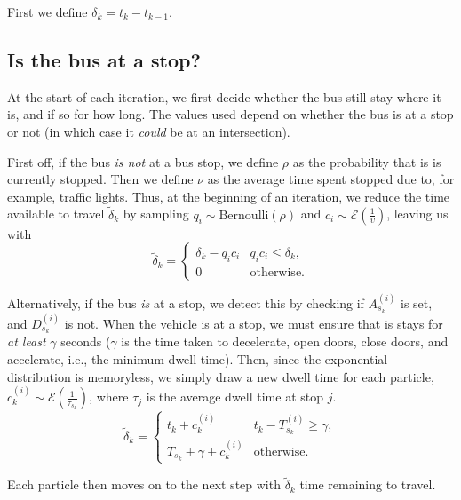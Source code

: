 \documentclass[14paper,twoside]{article}
\begin{document}
First we define $\delta_k = t_k - t_{k-1}$.

\subsection{Is the bus at a stop?}

At the start of each iteration, we first decide whether the bus still stay where it is,
and if so for how long.
The values used depend on whether the bus is at a stop or not (in which case it \emph{could} be 
at an intersection).

First off, if the bus \emph{is not} at a bus stop, we define $\rho$ as the probability that is
is currently stopped.
Then we define $\nu$ as the average time spent stopped due to, for example, traffic lights.
Thus, at the beginning of an iteration, we reduce the time available to travel $\tilde \delta_k$ 
by sampling $q_i \sim \mathrm{Bernoulli}(\rho)$ and $c_i \sim \mathcal{E}\left(\frac{1}{\upsilon}\right)$,
leaving us with
\begin{equation}
  \label{eq:start_intersection}
  \tilde\delta_k = 
  \begin{cases}
    \delta_k - q_i c_i & q_i c_i \leq \delta_k, \\
    0 & \text{otherwise}.
  \end{cases}
\end{equation}

Alternatively, if the bus \emph{is} at a stop, we detect this by checking if $A_{s_k}^{(i)}$ is set, 
and $D_{s_k}^{(i)}$ is not.
When the vehicle is at a stop, we must ensure that is stays for \emph{at least} $\gamma$ seconds
($\gamma$ is the time taken to decelerate, open doors, close doors, and accelerate, 
i.e., the minimum dwell time).
Then, since the exponential distribution is memoryless, we simply draw a new dwell time for each particle,
$c_k^{(i)} \sim \mathcal{E}\left(\frac{1}{\tau_{s_k}}\right)$,
where $\tau_j$ is the average dwell time at stop $j$.
\begin{equation}
  \label{eq:start_stop}
  \tilde\delta_k =
  \begin{cases}
    t_k + c_k^{(i)} & t_k - T_{s_k}^{(i)} \geq \gamma, \\
    T_{s_k} + \gamma + c_k^{(i)} & \text{otherwise}.
  \end{cases}
\end{equation}

Each particle then moves on to the next step with $\tilde\delta_k$ time remaining to travel.
\end{document}
